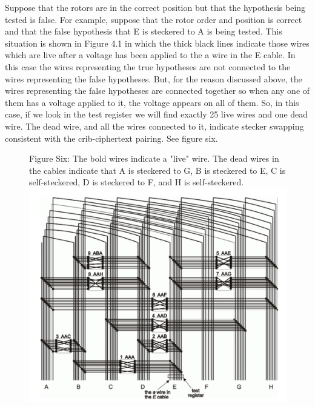 \documentclass[12pt,a4paper]{article}
\begin{document}
Suppose that the rotors are in the correct position but that the hypothesis being tested is false.
For example, suppose that the rotor order and position is correct and that the false hypothesis that E is steckered to A is being tested. This situation is shown in Figure 4.1 in which the thick black lines indicate those wires which are live after a voltage has been applied to the a wire in the E cable. In this case the wires representing the true hypotheses are not connected to the wires representing the false hypotheses. But, for the reason discussed above, the wires representing the false hypotheses are connected together so when any one of them has a voltage applied to it, the voltage appears on all of them. So, in this case, if we look in the test register we will find exactly 25 live wires and one dead wire. The dead wire, and all the wires connected to it, indicate stecker swapping consistent with the crib-ciphertext pairing. See figure six.

\begin{figure}[h]
\centering
Figure Six: The bold wires indicate a "live" wire. The dead wires in the cables indicate that A is steckered to G, B is steckered to E, C is self-steckered, D is steckered to F, and H is self-steckered.
\includegraphics[width=\textwidth]{BOMBEfour.png}
\end{figure}
\end{document}
